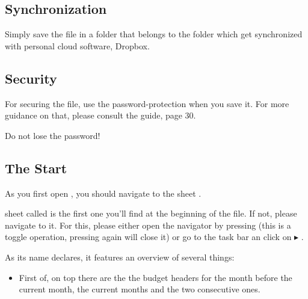 \subsection{Synchronization}
\label{subsec:synchronization}

Simply save the file in a folder that belongs to the folder which get synchronized with personal cloud software, \eg Dropbox.

\subsection{Security}
\label{subsec:security}

For securing the file, use the password-protection when you save it.
For more guidance on that, please consult the  guide, page 30.

\begin{specialnote}
Do not lose the password!
\end{specialnote}

\subsection{The Start}
\label{subsec:opening-the-file}

As you first open \tfn, you should navigate to the sheet .

sheet called  is the first one you'll find at the beginning of the file.
If not, please navigate to it.
For this, please either open the navigator by pressing  (this is a toggle operation, pressing  again will close it) or go to the task bar an click on  \( \blacktriangleright \) .

As its name declares, it features an overview of several things:
\begin{itemize}
	\item First of, on top there are the the budget headers for the month before the current month, the current months and the two consecutive ones.
\end{itemize}

